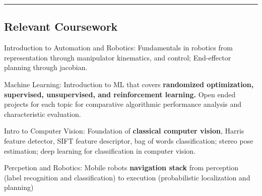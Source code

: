 
\hrule
\vspace{-1em}

\subsection*{Relevant Coursework}
\cvcond{\vspace{-0.5em}}
\begin{indentsection}{\parindent}
    \begin{description*}
		\item[Introduction to Automation and Robotics:] Fundamentals in robotics from representation through
		  manipulator kinematics, and control; End-effector planning through jacobian. 
        \item[Machine Learning:] Introduction to ML that covers \textbf{randomized optimization, supervised, unsupervised,
			and reinforcement learning.} Open ended projects for each topic 
			for comparative algorithmic performance analysis
            and characteristic evaluation.
		\item[Intro to Computer Vision:] Foundation of \textbf{classical computer vision}, Harris feature
		detector, SIFT feature descriptor, bag of words classification; stereo pose estimation;
		deep learning for classification in computer vision. 
		\item[Percpetion and Robotics:] Mobile robots \textbf{navigation stack} from perception (label recognition and classification) to
			execution (probabilistic localization and planning)
    \end{description*}
\end{indentsection}